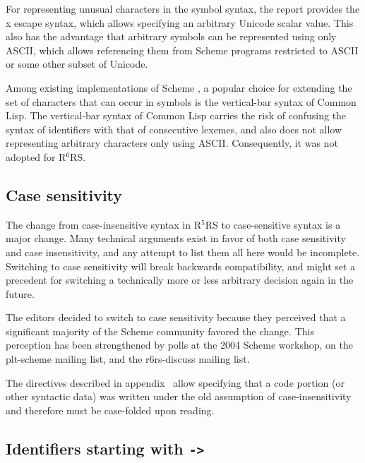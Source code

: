 \documentclass[twoside,twocolumn]{algol60}
\newcommand{\rn}[1]{R$^{#1}$RS}
\begin{document}
For representing unusual characters in the symbol syntax, the report
provides the {\cf\backwhack{}x} escape syntax, which allows specifying
an arbitrary Unicode scalar value.  This also has the advantage that
arbitrary symbols can be represented using only ASCII, which allows
referencing them from Scheme programs restricted to ASCII or some
other subset of Unicode.

Among existing implementations of Scheme , a popular choice for
extending the set of characters that can occur in symbols is the
vertical-bar syntax of Common Lisp.  The vertical-bar syntax of Common
Lisp carries the risk of confusing the syntax of identifiers with that
of consecutive lexemes, and also does not allow representing arbitrary
characters only using ASCII.  Consequently, it was not adopted for
\rn{6}.

\subsection{Case sensitivity}
\label{casesensitivityrationalesection}

The change from case-insensitive syntax in \rn{5} to case-sensitive
syntax is a major change.  Many technical arguments exist in favor of
both case sensitivity and case insensitivity, and any attempt to list
them all here would be incomplete.  
Switching to case sensitivity will break backwards compatibility, and
might set a precedent for switching a technically more or less
arbitrary decision again in the future.

The editors decided to switch to case sensitivity because they
perceived that a significant majority of the Scheme community favored
the change.  This perception has been strengthened by polls at the
2004 Scheme workshop, on the {\cf plt-scheme} mailing list, and the
{\cf r6rs-discuss} mailing list.

The directives described in
appendix~ allow specifying that a code portion (or other
syntactic data) was written under the old assumption of
case-insensitivity and therefore must be case-folded upon reading.

\subsection{Identifiers starting with {\tt ->}}
\end{document}
